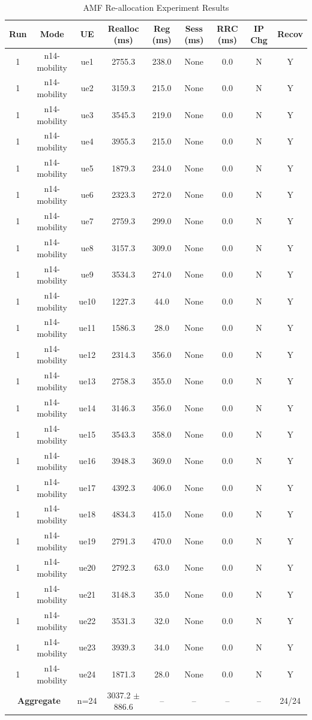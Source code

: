 \begin{table}[ht]
\centering
\begin{tabular}{|c|c|c|c|c|c|c|c|c|}
\hline
Run & Mode & UE & Realloc (ms) & Reg (ms) & Sess (ms) & RRC (ms) & IP Chg & Recov \\
\hline
1 & n14-mobility & ue1 & 2755.3 & 238.0 & None & 0.0 & N & Y \\
1 & n14-mobility & ue2 & 3159.3 & 215.0 & None & 0.0 & N & Y \\
1 & n14-mobility & ue3 & 3545.3 & 219.0 & None & 0.0 & N & Y \\
1 & n14-mobility & ue4 & 3955.3 & 215.0 & None & 0.0 & N & Y \\
1 & n14-mobility & ue5 & 1879.3 & 234.0 & None & 0.0 & N & Y \\
1 & n14-mobility & ue6 & 2323.3 & 272.0 & None & 0.0 & N & Y \\
1 & n14-mobility & ue7 & 2759.3 & 299.0 & None & 0.0 & N & Y \\
1 & n14-mobility & ue8 & 3157.3 & 309.0 & None & 0.0 & N & Y \\
1 & n14-mobility & ue9 & 3534.3 & 274.0 & None & 0.0 & N & Y \\
1 & n14-mobility & ue10 & 1227.3 & 44.0 & None & 0.0 & N & Y \\
1 & n14-mobility & ue11 & 1586.3 & 28.0 & None & 0.0 & N & Y \\
1 & n14-mobility & ue12 & 2314.3 & 356.0 & None & 0.0 & N & Y \\
1 & n14-mobility & ue13 & 2758.3 & 355.0 & None & 0.0 & N & Y \\
1 & n14-mobility & ue14 & 3146.3 & 356.0 & None & 0.0 & N & Y \\
1 & n14-mobility & ue15 & 3543.3 & 358.0 & None & 0.0 & N & Y \\
1 & n14-mobility & ue16 & 3948.3 & 369.0 & None & 0.0 & N & Y \\
1 & n14-mobility & ue17 & 4392.3 & 406.0 & None & 0.0 & N & Y \\
1 & n14-mobility & ue18 & 4834.3 & 415.0 & None & 0.0 & N & Y \\
1 & n14-mobility & ue19 & 2791.3 & 470.0 & None & 0.0 & N & Y \\
1 & n14-mobility & ue20 & 2792.3 & 63.0 & None & 0.0 & N & Y \\
1 & n14-mobility & ue21 & 3148.3 & 35.0 & None & 0.0 & N & Y \\
1 & n14-mobility & ue22 & 3531.3 & 32.0 & None & 0.0 & N & Y \\
1 & n14-mobility & ue23 & 3939.3 & 34.0 & None & 0.0 & N & Y \\
1 & n14-mobility & ue24 & 1871.3 & 28.0 & None & 0.0 & N & Y \\
\multicolumn{2}{|c|}{\textbf{Aggregate}} & n=24 & 3037.2 $\pm$ 886.6 & -- & -- & -- & -- & 24/24 \\
\hline
\end{tabular}
\caption{AMF Re-allocation Experiment Results}
\label{tab:amf_realloc}
\end{table}
